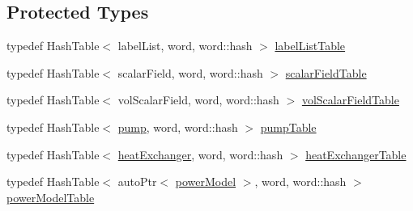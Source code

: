 \subsection*{Protected Types}
\begin{DoxyCompactItemize}
\item 
typedef Hash\+Table$<$ label\+List, word, word\+::hash $>$ \hyperlink{classFoam_1_1structure_afefd20eeb8d2675bfba9c1ce9aa78ca7}{label\+List\+Table}
\item 
typedef Hash\+Table$<$ scalar\+Field, word, word\+::hash $>$ \hyperlink{classFoam_1_1structure_a2fdb5cf3126746b10e53fb86215f3249}{scalar\+Field\+Table}
\item 
typedef Hash\+Table$<$ vol\+Scalar\+Field, word, word\+::hash $>$ \hyperlink{classFoam_1_1structure_a821486e30c5f9ed2852aeddc4ff8ff30}{vol\+Scalar\+Field\+Table}
\item 
typedef Hash\+Table$<$ \hyperlink{classFoam_1_1pump}{pump}, word, word\+::hash $>$ \hyperlink{classFoam_1_1structure_a3cad7e6a25055d05c668b06551d372c5}{pump\+Table}
\item 
typedef Hash\+Table$<$ \hyperlink{classFoam_1_1heatExchanger}{heat\+Exchanger}, word, word\+::hash $>$ \hyperlink{classFoam_1_1structure_a22ffcc3b5fb77bcb044a05e138ec4076}{heat\+Exchanger\+Table}
\item 
typedef Hash\+Table$<$ auto\+Ptr$<$ \hyperlink{classFoam_1_1powerModel}{power\+Model} $>$, word, word\+::hash $>$ \hyperlink{classFoam_1_1structure_a5b1d82b72cd629a4695e6c44b37da7a7}{power\+Model\+Table}
\end{DoxyCompactItemize}
